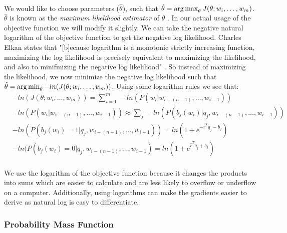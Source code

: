 \paragraph{}
We would like to choose parameters ($\hat{\theta}$), such that $\hat{\theta} = \operatorname*{arg\,max}_\theta J(\theta;w_i,\dots, w_m)$. $\hat{\theta}$ is known as the \emph{maximum likelihood estimator} of $\theta$ \cite{Elkan2013}.  In our actual usage of the objective function we will modify it slightly. We can take the negative natural logarithm of the objective function to get the negative log likelihood. Charles Elkan states that "[b]ecause logarithm is a monotonic strictly increasing function, maximizing the log likelihood is precisely equivalent to maximizing the likelihood, and also to minifmizing the negative log likelihood" \cite[pg. 3]{Elkan2013}. So instead of maximizing the likelihood, we now minimize the negative log likelihood such that  $\hat{\theta} = \operatorname*{arg\,min}_\theta -ln(J(\theta;w_i,\dots, w_m))$.
Using some logarithm rules we see that:
\begin{align}
&-ln(J(\theta;w_i,\dots, w_m)) = \sum_{i=1}^{m} -ln(P(w_i | w_{i-(n-1)},\dots, w_{i-1}))
\\
&-ln(P(w_i | w_{i-(n-1)},\dots, w_{i-1})) \approx \sum_j - ln(P(b_j(w_i) | q_j, w_{i-(n-1)},\dots, w_{i-1})) 
\\
&- ln(P(b_j(w_i) = 1 | q_j, w_{i-(n-1)},\dots, w_{i-1})) = ln (1 + e^{-\hat{r}^T q_{j} -b_{j}}) \nonumber
\\
&- ln(P(b_j(w_i) = 0 | q_j, w_{i-(n-1)},\dots, w_{i-1}) = ln (1 + e^{\hat{r}^T q_{j} +b_{j}}) \nonumber
\end{align}

\paragraph{}
We use the logarithm of the objective function because it changes the products into sums which are easier to calculate and are less likely to overflow or underflow on a computer. Additionally, using logarithms can make the gradients easier to derive as natural log is easy to differentiate.


\subsubsection{Probability Mass Function}
